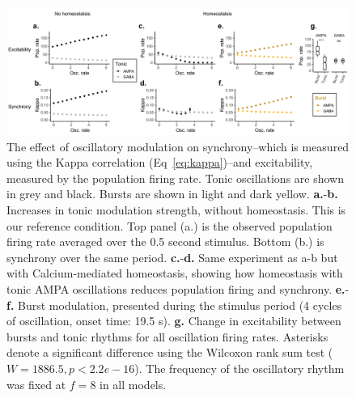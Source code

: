 \documentclass{article}
\begin{document}
\begin{figure}
\centering
\includegraphics[width=1\textwidth]{fig2.png}
\caption{\label{fig:f2}
    The effect of oscillatory modulation on synchrony--which is measured using the Kappa correlation (Eq~\ref{eq:kappa})--and excitability, measured by the population firing rate. Tonic oscillations are shown in grey and black. Bursts are shown in light and dark yellow.
    \textbf{a.}-\textbf{b.} Increases in tonic modulation strength, without homeostasis. This is our reference condition. Top panel (a.) is the observed population firing rate averaged over the 0.5 second stimulus. Bottom (b.) is synchrony over the same period.
    \textbf{c.}-\textbf{d.} Same experiment as a-b but with Calcium-mediated homeostasis, showing how homeostasis with tonic AMPA oscillations reduces population firing and synchrony.
    \textbf{e.}-\textbf{f.} Burst modulation, presented during the stimulus period (4 cycles of oscillation, onset time: 19.5 s).
    \textbf{g.} Change in excitability between bursts and tonic rhythms for all oscillation firing rates. Asterisks denote a significant difference using the Wilcoxon rank sum test ($W = 1886.5, p < 2.2e-16$). The frequency of the oscillatory rhythm was fixed at $f = 8$ in all models.}
\end{figure}


\end{document}
